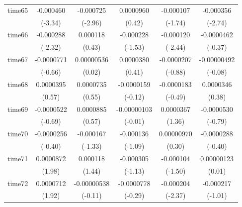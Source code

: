 \begin{table}[htbp]
\begin{tabular}{l*{5}{c}}
time65      &   -0.000460\sym{***}&   -0.000725\sym{**} &   0.0000960         &   -0.000107         &   -0.000356\sym{**} \\
            &     (-3.34)         &     (-2.96)         &      (0.42)         &     (-1.74)         &     (-2.74)         \\
time66      &   -0.000288\sym{*}  &    0.000118         &   -0.000228         &   -0.000120\sym{*}  &  -0.0000462         \\
            &     (-2.32)         &      (0.43)         &     (-1.53)         &     (-2.44)         &     (-0.37)         \\
time67      &  -0.0000771         &  0.00000536         &   0.0000380         &  -0.0000207         & -0.00000492         \\
            &     (-0.66)         &      (0.02)         &      (0.41)         &     (-0.88)         &     (-0.08)         \\
time68      &   0.0000395         &   0.0000735         &  -0.0000159         &  -0.0000183         &   0.0000346         \\
            &      (0.57)         &      (0.55)         &     (-0.12)         &     (-0.49)         &      (0.38)         \\
time69      &  -0.0000522         &   0.0000885         & -0.00000103         &   0.0000367         &  -0.0000530         \\
            &     (-0.69)         &      (0.57)         &     (-0.01)         &      (1.36)         &     (-0.79)         \\
time70      &  -0.0000256         &   -0.000167         &   -0.000136         &  0.00000970         &  -0.0000288         \\
            &     (-0.40)         &     (-1.33)         &     (-1.09)         &      (0.30)         &     (-0.40)         \\
time71      &   0.0000872\sym{*}  &    0.000118         &   -0.000305         &   -0.000104         &  0.00000123         \\
            &      (1.98)         &      (1.44)         &     (-1.13)         &     (-1.50)         &      (0.01)         \\
time72      &   0.0000712         & -0.00000538         &  -0.0000778         &   -0.000204\sym{*}  &   -0.000217         \\
            &      (1.92)         &     (-0.11)         &     (-0.29)         &     (-2.37)         &     (-1.01)         \\

\end{tabular}
\end{table}
